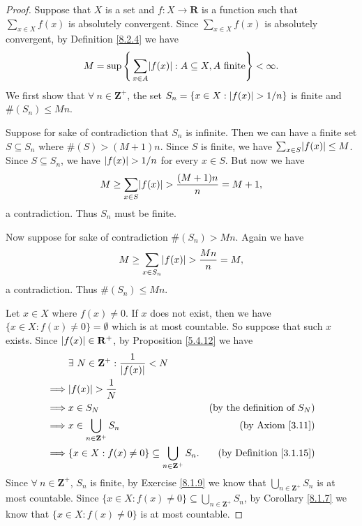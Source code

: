\begin{proof}
    Suppose that \(X\) is a set and \(f : X \to \mathbf{R}\) is a function such that \(\sum_{x \in X} f(x)\) is absolutely convergent.
    Since \(\sum_{x \in X} f(x)\) is absolutely convergent, by Definition \ref{8.2.4} we have
    \[
        M = \sup\Bigg\{\sum_{x \in A} \abs*{f(x)} : A \subseteq X, A \text{ finite}\Bigg\} < \infty.
    \]
    We first show that \(\forall\ n \in \mathbf{Z}^+\), the set \(S_n = \{x \in X : \abs*{f(x)} > 1 / n\}\) is finite and \(\#(S_n) \leq Mn\).

    Suppose for sake of contradiction that \(S_n\) is infinite.
    Then we can have a finite set \(S \subseteq S_n\) where \(\#(S) > (M + 1)n\).
    Since \(S\) is finite, we have \(\sum_{x \in S} \abs*{f(x)} \leq M\).
    Since \(S \subseteq S_n\), we have \(\abs*{f(x)} > 1 / n\) for every \(x \in S\).
    But now we have
    \[
        M \geq \sum_{x \in S} \abs*{f(x)} > \frac{(M + 1)n}{n} = M + 1,
    \]
    a contradiction.
    Thus \(S_n\) must be finite.

    Now suppose for sake of contradiction \(\#(S_n) > Mn\).
    Again we have
    \[
        M \geq \sum_{x \in S_n} \abs*{f(x)} > \frac{Mn}{n} = M,
    \]
    a contradiction.
    Thus \(\#(S_n) \leq Mn\).

    Let \(x \in X\) where \(f(x) \neq 0\).
    If \(x\) does not exist, then we have \(\{x \in X : f(x) \neq 0\} = \emptyset\) which is at most countable.
    So suppose that such \(x\) exists.
    Since \(\abs*{f(x)} \in \mathbf{R}^+\), by Proposition \ref{5.4.12} we have
    \begin{align*}
                 & \exists\ N \in \mathbf{Z}^+ : \frac{1}{\abs*{f(x)}} < N                                                       \\
        \implies & \abs*{f(x)} > \frac{1}{N}                                                                                     \\
        \implies & x \in S_N                                                             & \text{(by the definition of \(S_N\))} \\
        \implies & x \in \bigcup_{n \in \mathbf{Z}^+} S_n                                & \text{(by Axiom \ref{3.11})}          \\
        \implies & \{x \in X : f(x) \neq 0\} \subseteq \bigcup_{n \in \mathbf{Z}^+} S_n. & \text{(by Definition \ref{3.1.15})}
    \end{align*}
    Since \(\forall\ n \in \mathbf{Z}^+\), \(S_n\) is finite, by Exercise \ref{8.1.9} we know that \(\bigcup_{n \in \mathbf{Z}^+} S_n\) is at most countable.
    Since \(\{x \in X : f(x) \neq 0\} \subseteq \bigcup_{n \in \mathbf{Z}^+} S_n\), by Corollary \ref{8.1.7} we know that \(\{x \in X : f(x) \neq 0\}\) is at most countable.
\end{proof}

